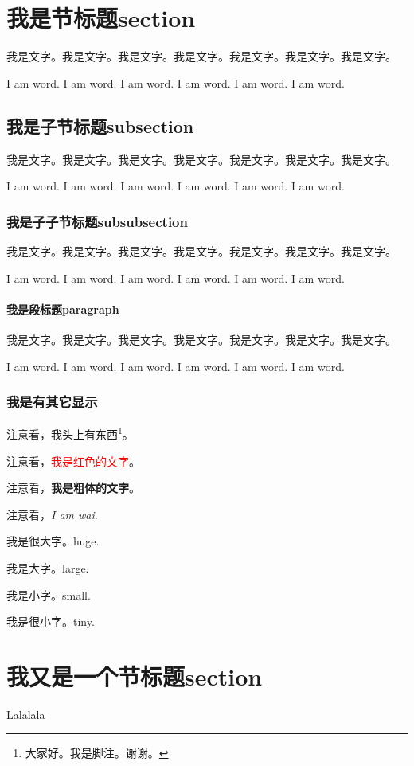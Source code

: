 \section{我是节标题section}
我是文字。我是文字。我是文字。我是文字。我是文字。我是文字。我是文字。

I am word. I am word. I am word. I am word. I am word. I am word. 

\subsection{我是子节标题subsection}
我是文字。我是文字。我是文字。我是文字。我是文字。我是文字。我是文字。

I am word. I am word. I am word. I am word. I am word. I am word. 

\subsubsection{我是子子节标题subsubsection}
我是文字。我是文字。我是文字。我是文字。我是文字。我是文字。我是文字。

I am word. I am word. I am word. I am word. I am word. I am word. 


\paragraph{我是段标题paragraph}
我是文字。我是文字。我是文字。我是文字。我是文字。我是文字。我是文字。

I am word. I am word. I am word. I am word. I am word. I am word. 

\subsubsection{我是有其它显示}
注意看，我头上有东西\footnote{大家好。我是脚注。谢谢。}。

注意看，\textcolor{red}{我是红色的文字}。

注意看，\textbf{我是粗体的文字}。

注意看，\textit{I am wai}.

\begin{huge}
我是很大字。huge.
\end{huge}

\begin{large}
我是大字。large.
\end{large}


\begin{small}
我是小字。small.
\end{small}

\begin{tiny}
我是很小字。tiny.
\end{tiny}

\section{我又是一个节标题section}
Lalalala

